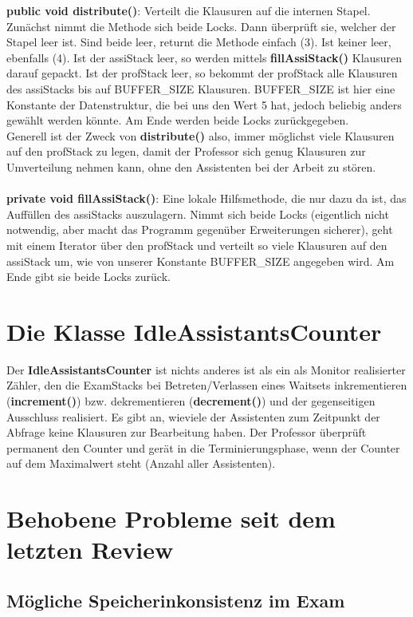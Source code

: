 \documentclass[12pt,a4paper]{article}
\begin{document}
\textbf{public void distribute()}: Verteilt die Klausuren auf die internen Stapel. Zunächst nimmt die Methode sich beide Locks. Dann überprüft sie, welcher der Stapel leer ist. Sind beide leer, returnt die Methode einfach (3). Ist keiner leer, ebenfalls (4). Ist der assiStack leer, so werden mittels \textbf{fillAssiStack()} Klausuren darauf gepackt. Ist der profStack leer, so bekommt der profStack alle Klausuren des assiStacks bis auf BUFFER\_SIZE Klausuren. BUFFER\_SIZE ist hier eine Konstante der Datenstruktur, die bei uns den Wert 5 hat, jedoch beliebig anders gewählt werden könnte. Am Ende werden beide Locks zurückgegeben.\\
Generell ist der Zweck von\textbf{ distribute()} also, immer möglichst viele Klausuren auf den profStack zu legen, damit der Professor sich genug Klausuren zur Umverteilung nehmen kann, ohne den Assistenten bei der Arbeit zu stören.
\\
\\
\textbf{private void fillAssiStack()}: Eine lokale Hilfsmethode, die nur dazu da ist, das Auffüllen des assiStacks auszulagern. Nimmt sich beide Locks (eigentlich nicht notwendig, aber macht das Programm gegenüber Erweiterungen sicherer), geht mit einem Iterator über den profStack und verteilt so viele Klausuren auf den assiStack um, wie von unserer Konstante BUFFER\_SIZE angegeben wird. Am Ende gibt sie beide Locks zurück.

\newpage
\section{Die Klasse IdleAssistantsCounter}

Der \textbf{IdleAssistantsCounter} ist nichts anderes ist als ein als Monitor realisierter Zähler, den die ExamStacks bei Betreten/Verlassen eines Waitsets inkrementieren (\textbf{increment()}) bzw. dekrementieren (\textbf{decrement()}) und der gegenseitigen Ausschluss realisiert. Es gibt an, wieviele der Assistenten zum Zeitpunkt der Abfrage keine Klausuren zur Bearbeitung haben. Der Professor überprüft permanent den Counter und gerät in die Terminierungsphase, wenn der Counter auf dem Maximalwert steht (Anzahl aller Assistenten). 

\newpage
\section{Behobene Probleme seit dem letzten Review}
\subsection{Mögliche Speicherinkonsistenz im Exam}
\end{document}
